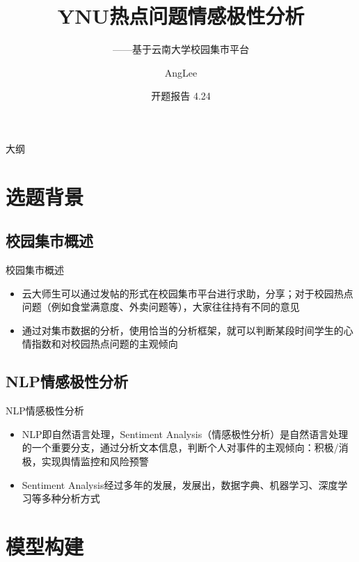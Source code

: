 \documentclass[UTF8]{ctexbeamer}
\title{YNU热点问题情感极性分析}
\subtitle{——基于云南大学校园集市平台}
\author{AngLee}
\institute[Universitiy]{
	2023 Spring MachineLearning Course\\
	YunNan University
 }
\date{开题报告 4.24}
\begin{document}
\begin{frame}
  \titlepage
\end{frame}

\begin{frame}{大纲}
  \tableofcontents
\end{frame}


\section{选题背景}

\subsection{校园集市概述}
\begin{frame}{校园集市概述}
  \begin{itemize}
  \item {
    云大师生可以通过发帖的形式在校园集市平台进行求助，分享；对于校园热点问题（例如食堂满意度、外卖问题等），大家往往持有不同的意见
  }
  \item {
    通过对集市数据的分析，使用恰当的分析框架，就可以判断某段时间学生的心情指数和对校园热点问题的主观倾向
  }
  \end{itemize}
\end{frame}

\subsection{NLP情感极性分析}

\begin{frame}{NLP情感极性分析}
   \begin{itemize}
  \item {
    NLP即自然语言处理，Sentiment Analysis（情感极性分析）是自然语言处理的一个重要分支，通过分析文本信息，判断个人对事件的主观倾向：积极/消极，实现舆情监控和风险预警
  }
  \item {
    Sentiment Analysis经过多年的发展，发展出，数据字典、机器学习、深度学习等多种分析方式
  }
  \end{itemize}
\end{frame}


\section{模型构建}
\end{document}
